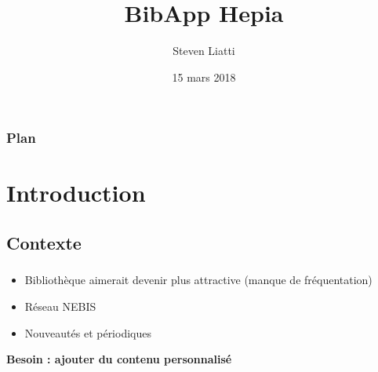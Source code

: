 \documentclass[10pt]{beamer}
\begin{document}

\title{BibApp Hepia}
\author{Steven Liatti}
\date{15 mars 2018}

\begin{frame}
\titlepage
\end{frame}

\begin{frame}
    \frametitle{Plan}
	\setcounter{tocdepth}{3}
	\tableofcontents
\end{frame}

\section{Introduction}
\subsection{Contexte}
\begin{frame}
	\frametitle{\secname}
	\framesubtitle{\subsecname}
    \begin{itemize}
        \item Bibliothèque aimerait devenir plus attractive (manque de fréquentation)
        \item Réseau NEBIS
        \item Nouveautés et périodiques
    \end{itemize}
    \Large\textbf{Besoin : ajouter du contenu personnalisé}
\end{frame}
\end{document}
